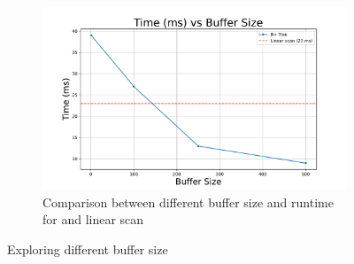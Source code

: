 \begin{figure}[h]
    \begin{subfigure}[t]{0.55\textwidth}
        \centering
        \includegraphics[width=0.95\linewidth]{figures/time_vs_buffer_size.pdf}
        \caption{Comparison between different buffer size and runtime for \bplustree and linear scan}
        \label{subfig:time-vs-buffer}
    \end{subfigure}
    \caption{Exploring different buffer size}
\end{figure}


